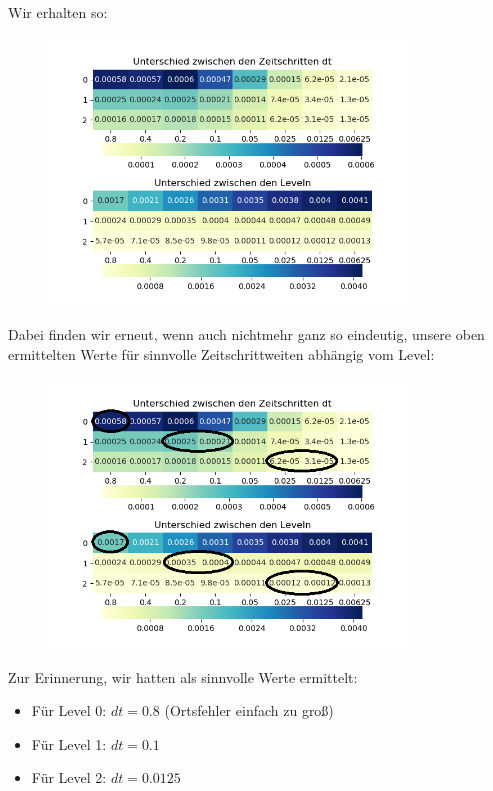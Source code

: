 Wir erhalten so: 
\begin{figure}[H]
	\centering
	\includegraphics[width=0.85\textwidth]{../Aufgabe31/Maxdiff/Heatmapblubintegral.png}
\end{figure}
Dabei finden wir erneut, wenn auch nichtmehr ganz so eindeutig, unsere oben ermittelten Werte für sinnvolle Zeitschrittweiten abhängig vom Level:
\begin{figure}[H]
	\centering
	\includegraphics[width=0.85\textwidth]{../Aufgabe31/Maxdiff/Heatmapblubintegral1.png}
\end{figure}
Zur Erinnerung, wir hatten als sinnvolle Werte ermittelt:
\begin{itemize}
	\item Für Level 0: \qquad $dt = 0.8$ (Ortsfehler einfach zu groß)
	\item Für Level 1: \qquad $dt = 0.1$ 
	\item Für Level 2: \qquad $dt = 0.0125$
\end{itemize}
 




